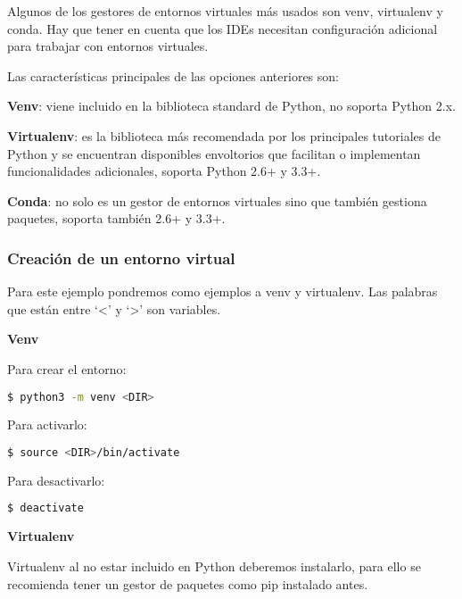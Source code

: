 Algunos de los gestores de entornos virtuales más usados son venv, virtualenv y conda. Hay que tener en cuenta que los IDEs necesitan configuración adicional para trabajar con entornos virtuales. 

Las características principales de las opciones anteriores son:

\begin{list}{-}{}
\item \textbf{Venv}: viene incluido en la biblioteca standard de Python, no soporta Python 2.x.
\item \textbf{Virtualenv}: es la biblioteca más recomendada por los principales tutoriales de Python y se encuentran disponibles envoltorios que facilitan o implementan funcionalidades adicionales, soporta Python 2.6+ y 3.3+.
\item \textbf{Conda}: no solo es un gestor de entornos virtuales sino que también gestiona paquetes, soporta también 2.6+ y 3.3+.
\end{list}

\subsubsection{Creación de un entorno virtual}

Para este ejemplo pondremos como ejemplos a venv y virtualenv. Las palabras que están entre `\textless ' y `\textgreater ' son variables. 

\hphantom{something\\}
{\normalsize \textbf{Venv}}

Para crear el entorno: 

\begin{lstlisting}[language=bash]
    $ python3 -m venv <DIR>
\end{lstlisting}


Para activarlo: 

\begin{lstlisting}[language=bash]
    $ source <DIR>/bin/activate
\end{lstlisting}


Para desactivarlo: 


\begin{lstlisting}[language=bash]
    $ deactivate
\end{lstlisting}


\hphantom{something\\}
{\normalsize \textbf{Virtualenv}}

Virtualenv al no estar incluido en Python deberemos instalarlo, para ello se recomienda tener un gestor de paquetes como pip instalado antes.

